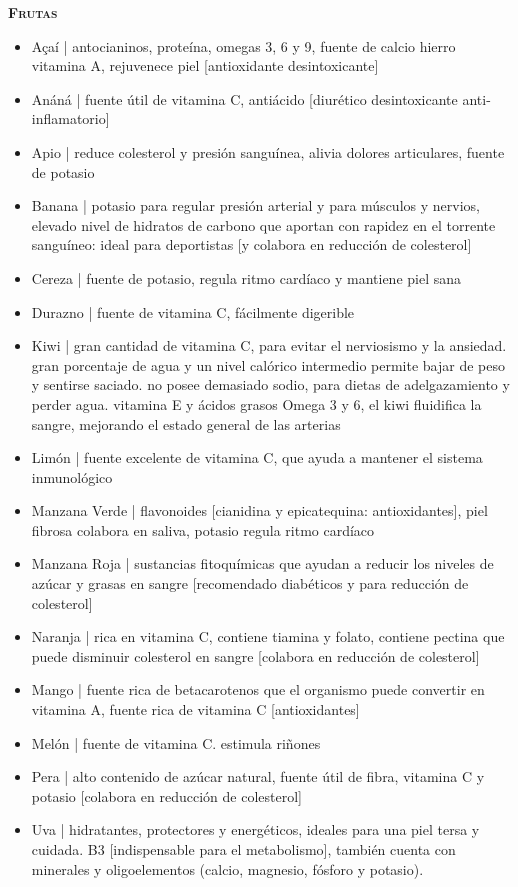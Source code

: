 
\textbf{\textsc{Frutas}}

\begin{itemize}
 \item Açaí | antocianinos, proteína, omegas 3, 6 y 9, fuente de calcio hierro vitamina A, rejuvenece piel [antioxidante desintoxicante]
 \item Anáná | fuente útil de vitamina C, antiácido [diurético desintoxicante anti-inflamatorio]
 \item Apio | reduce colesterol y presión sanguínea, alivia dolores articulares, fuente de potasio
 \item Banana | potasio para regular presión arterial y para músculos y nervios, elevado nivel de hidratos de carbono que aportan con rapidez en el torrente sanguíneo: ideal para deportistas [y colabora en reducción de colesterol]
 \item Cereza | fuente de potasio, regula ritmo cardíaco y mantiene piel sana
 \item Durazno | fuente de vitamina C, fácilmente digerible
 \item Kiwi | gran cantidad de vitamina C, para evitar el nerviosismo y la ansiedad. gran porcentaje de agua y un nivel calórico intermedio permite bajar de peso y sentirse saciado. no posee demasiado sodio, para dietas de adelgazamiento y perder agua. vitamina E y ácidos grasos Omega 3 y 6, el kiwi fluidifica la sangre, mejorando el estado general de las arterias
 \item Limón | fuente excelente de vitamina C, que ayuda a mantener el sistema inmunológico
 \item Manzana Verde | flavonoides [cianidina y epicatequina: antioxidantes], piel fibrosa colabora en saliva, potasio regula ritmo cardíaco
 \item Manzana Roja | sustancias fitoquímicas que ayudan a reducir los niveles de azúcar y grasas en sangre [recomendado diabéticos y para reducción de colesterol]
 \item Naranja | rica en vitamina C, contiene tiamina y folato, contiene pectina que puede disminuir colesterol en sangre [colabora en reducción de colesterol]
 \item Mango | fuente rica de betacarotenos que el organismo puede convertir en vitamina A, fuente rica de vitamina C [antioxidantes]
 \item Melón | fuente de vitamina C. estimula riñones
 \item Pera | alto contenido de azúcar natural, fuente útil de fibra, vitamina C y potasio [colabora en reducción de colesterol]
 \item Uva | hidratantes, protectores y energéticos, ideales para una piel tersa y cuidada. B3 [indispensable para el metabolismo], también cuenta con minerales y oligoelementos (calcio, magnesio, fósforo y potasio).
\end{itemize}